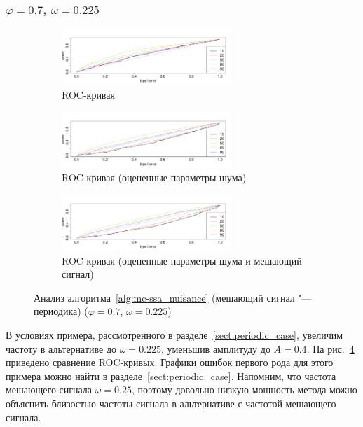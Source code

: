 \documentclass[specialist,
substylefile = spbu_report.rtx,
subf,href,colorlinks=true, 12pt]{disser}
\theoremstyle{definition}
\begin{document}
\subsubsection{$\varphi=0.7$, $\omega=0.225$}
\begin{figure}[h!]
	\captionsetup[subfigure]{justification=Centering}
	\begin{subfigure}[t]{\textwidth}
		\centering
		\includegraphics[width=0.7\textwidth]{img/roc_sin_phi7_omega0225.pdf}
		\caption{ROC-кривая}
		\label{fig:roc_sin_phi7_omega0225}
	\end{subfigure}
	\begin{subfigure}[t]{\textwidth}
		\centering
		\includegraphics[width=0.7\textwidth]{img/roc_sin_phi7est_omega0225.pdf}
		\caption{ROC-кривая (оцененные параметры шума)}
		\label{fig:roc_sin_phi7est_omega0225}
	\end{subfigure}
	\begin{subfigure}[t]{\textwidth}
		\centering
		\includegraphics[width=0.7\textwidth]{img/roc_sin_phi7est_signal_omega0225.pdf}
		\caption{ROC-кривая (оцененные параметры шума и мешающий сигнал)}
		\label{fig:roc_sin_phi7est_signal_omega0225}
	\end{subfigure}
	\caption{Анализ алгоритма~\ref{alg:mc-ssa_nuisance} (мешающий сигнал "--- периодика) ($\varphi=0.7$, $\omega=0.225$)}
	\label{fig:sin_phi7_omega0225}
\end{figure}

В условиях примера, рассмотренного в разделе~\ref{sect:periodic_case}, увеличим частоту в альтернативе до $\omega=0.225$, уменьшив амплитуду до $A=0.4$. На рис.~\ref{fig:sin_phi7_omega0225} приведено сравнение ROC-кривых. Графики ошибок первого рода для этого примера можно найти в разделе~\ref{sect:periodic_case}. Напомним, что частота мешающего сигнала $\omega=0.25$, поэтому довольно низкую мощность метода можно объяснить близостью частоты сигнала в альтернативе с частотой мешающего сигнала.
\end{document}
